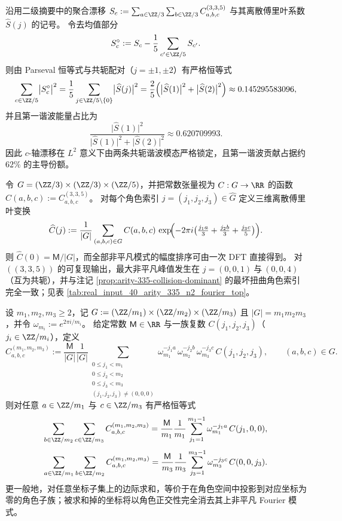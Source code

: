 \begin{remark}\label{rem:arity-335-collision-axis-bimodal-lock-parseval}
沿用二级摘要中的聚合漂移
\(
S_c:=\sum_{a\in\ZZ/3}\sum_{b\in\ZZ/3}C^{(3,3,5)}_{a,b,c}
\)
与其离散傅里叶系数 \(\widehat S(j)\) 的记号。
令去均值部分
\[
S_c^\circ:=S_c-\frac{1}{5}\sum_{c'\in\ZZ/5}S_{c'}.
\]
则由 Parseval 恒等式与共轭配对（\(j=\pm1,\pm2\)）有严格恒等式
\[
\sum_{c\in\ZZ/5}\bigl|S_c^\circ\bigr|^2
=\frac{1}{5}\sum_{j\in\ZZ/5\setminus\{0\}}\bigl|\widehat S(j)\bigr|^2
=\frac{2}{5}\Bigl(\bigl|\widehat S(1)\bigr|^2+\bigl|\widehat S(2)\bigr|^2\Bigr)
\approx 0.145295583096,
\]
并且第一谐波能量占比为
\[
\frac{\bigl|\widehat S(1)\bigr|^2}{\bigl|\widehat S(1)\bigr|^2+\bigl|\widehat S(2)\bigr|^2}\approx 0.620709993.
\]
因此 \(c\)-轴漂移在 \(L^2\) 意义下由两条共轭谐波模态严格锁定，且第一谐波贡献占据约 \(62\%\) 的主导份额。
\end{remark}

\begin{remark}\label{rem:arity-335-constant-tensor-3d-dft-worst}
令 \(G=(\ZZ/3)\times(\ZZ/3)\times(\ZZ/5)\)，并把常数张量视为 \(C:G\to\RR\) 的函数 \(C(a,b,c):=C^{(3,3,5)}_{a,b,c}\)。
对每个角色索引 \(j=(j_1,j_2,j_3)\in\widehat G\) 定义三维离散傅里叶变换
\[
\widehat C(j)
:=\frac{1}{|G|}\sum_{(a,b,c)\in G} C(a,b,c)\,
\exp\!\Bigl(-2\pi i\bigl(\tfrac{j_1a}{3}+\tfrac{j_2b}{3}+\tfrac{j_3c}{5}\bigr)\Bigr).
\]
则 \(\widehat C(0)=\mathsf{M}/|G|\)，而全部非平凡模式的幅度排序可由一次 DFT 直接得到。
对 \(((3,3,5))\) 的可复现输出，最大非平凡峰值发生在
\(
j=(0,0,1)\ \text{与}\ (0,0,4)
\)
（互为共轭），并与注记 \ref{prop:arity-335-collision-dominant} 的最坏扭曲角色索引完全一致；见表 \ref{tab:real_input_40_arity_335_n2_fourier_top}。
\end{remark}


\begin{lemma}[边际求和即角色投影]\label{lem:arity-character-projection}
设 \(m_1,m_2,m_3\ge 2\)，记
\(
G:=(\ZZ/m_1)\times(\ZZ/m_2)\times(\ZZ/m_3)
\)
且 \(|G|=m_1m_2m_3\)，并令 \(\omega_{m_i}:=e^{2\pi i/m_i}\)。
给定常数 \(\mathsf{M}\in\RR\) 与一族复数 \(C(j_1,j_2,j_3)\)（\(j_i\in\ZZ/m_i\)），定义
\[
C^{(m_1,m_2,m_3)}_{a,b,c}
:=
\frac{\mathsf{M}}{|G|}
\frac{1}{|G|}
\!\!\!\sum_{\substack{0\le j_1<m_1\\0\le j_2<m_2\\0\le j_3<m_3\\(j_1,j_2,j_3)\ne(0,0,0)}}
\omega_{m_1}^{-j_1a}\,\omega_{m_2}^{-j_2b}\,\omega_{m_3}^{-j_3c}\,C(j_1,j_2,j_3),
\qquad (a,b,c)\in G.
\]
则对任意 \(a\in\ZZ/m_1\) 与 \(c\in\ZZ/m_3\) 有严格恒等式
\[
\sum_{b\in\ZZ/m_2}\sum_{c\in\ZZ/m_3} C^{(m_1,m_2,m_3)}_{a,b,c}
=
\frac{\mathsf{M}}{m_1}
\frac{1}{m_1}\sum_{j_1=1}^{m_1-1}\omega_{m_1}^{-j_1a}\,C(j_1,0,0),
\]
\[
\sum_{a\in\ZZ/m_1}\sum_{b\in\ZZ/m_2} C^{(m_1,m_2,m_3)}_{a,b,c}
=
\frac{\mathsf{M}}{m_3}
\frac{1}{m_3}\sum_{j_3=1}^{m_3-1}\omega_{m_3}^{-j_3c}\,C(0,0,j_3).
\]
更一般地，对任意坐标子集上的边际求和，等价于在角色空间中投影到对应坐标为零的角色子族；被求和掉的坐标将以角色正交性完全消去其上非平凡 Fourier 模式。
\end{lemma}

